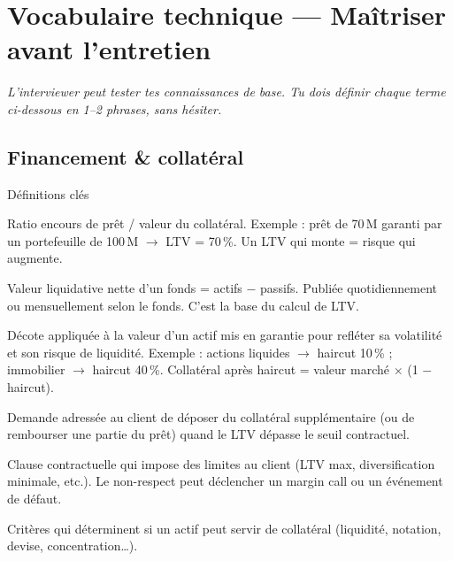\documentclass[11pt,a4paper]{article}
\begin{document}
\section{Vocabulaire technique --- Ma\^itriser avant l'entretien}

\textcolor{warmgray}{\textit{L'interviewer peut tester tes connaissances de base. Tu dois
d\'efinir chaque terme ci-dessous en 1--2 phrases, sans h\'esiter.}}

\subsection{Financement \& collat\'eral}

\begin{graybox}{D\'efinitions cl\'es}
\begin{description}[style=nextline, leftmargin=1cm, nosep, itemsep=6pt]
\item[\textbf{LTV (Loan-to-Value)}]
Ratio encours de pr\^et / valeur du collat\'eral.
Exemple : pr\^et de 70\,M\texteuro{} garanti par un portefeuille de 100\,M\texteuro{}
$\rightarrow$ LTV = 70\,\%.
Un LTV qui monte = risque qui augmente.

\item[\textbf{NAV (Net Asset Value)}]
Valeur liquidative nette d'un fonds = actifs $-$ passifs.
Publi\'ee quotidiennement ou mensuellement selon le fonds.
C'est la base du calcul de LTV.

\item[\textbf{Haircut}]
D\'ecote appliqu\'ee \`a la valeur d'un actif mis en garantie pour refl\'eter
sa volatilit\'e et son risque de liquidit\'e.
Exemple : actions liquides $\rightarrow$ haircut 10\,\% ; immobilier $\rightarrow$ haircut 40\,\%.
Collat\'eral apr\`es haircut = valeur march\'e $\times$ (1 $-$ haircut).

\item[\textbf{Margin call (appel de marge)}]
Demande adress\'ee au client de d\'eposer du collat\'eral suppl\'ementaire
(ou de rembourser une partie du pr\^et) quand le LTV d\'epasse le seuil contractuel.

\item[\textbf{Covenant}]
Clause contractuelle qui impose des limites au client (LTV max,
diversification minimale, etc.). Le non-respect peut d\'eclencher un
margin call ou un \'ev\'enement de d\'efaut.

\item[\textbf{\'Eligibilit\'e}]
Crit\`eres qui d\'eterminent si un actif peut servir de collat\'eral
(liquidit\'e, notation, devise, concentration\ldots).


\end{description}
\end{graybox}
\end{document}
